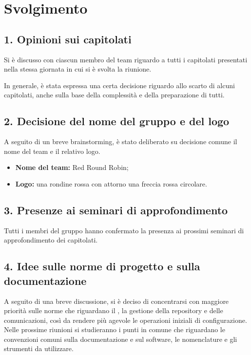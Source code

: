 \newpage
\section*{Svolgimento}

\subsection*{1. Opinioni sui capitolati}

Si è discusso con ciascun membro del team riguardo a tutti i capitolati presentati nella stessa giornata in cui si è svolta la riunione. 

In generale, è stata espressa una certa decisione riguardo allo scarto di alcuni capitolati, anche sulla base della complessità e della preparazione di tutti.

\subsection*{2. Decisione del nome del gruppo e del logo}

A seguito di un breve brainstorming, è stato deliberato su decisione comune il nome del team e il relativo logo.

\begin{itemize}
	\item \textbf{Nome del team:} Red Round Robin;
	\item \textbf{Logo:} una rondine rossa con attorno una freccia rossa circolare.
\end{itemize}

\subsection*{3. Presenze ai seminari di approfondimento}

Tutti i membri del gruppo hanno confermato la presenza ai prossimi seminari di approfondimento dei capitolati.

\subsection*{4. Idee sulle norme di progetto e sulla documentazione}

A seguito di una breve discussione, si è deciso di concentrarsi con maggiore priorità sulle norme che riguardano il , la gestione della repository e delle comunicazioni, così da rendere più agevole le operazioni iniziali di configurazione.
Nelle prossime riunioni si studieranno i punti in comune che riguardano le convenzioni comuni sulla documentazione e sul software, le nomenclature e gli strumenti da utilizzare. 

